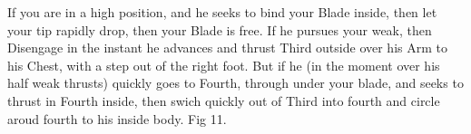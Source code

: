 If you are in a high position, and he seeks to bind your Blade inside, then let your tip rapidly drop, then your Blade is free. If he pursues your weak, then Disengage in the instant he advances and thrust Third outside over his Arm to his Chest, with a step out of the right foot. But if he (in the moment over his half weak thrusts) quickly goes to Fourth, through under your blade, and seeks to thrust in Fourth inside, then swich quickly out of Third into fourth and circle aroud fourth to his inside body. Fig 11.
